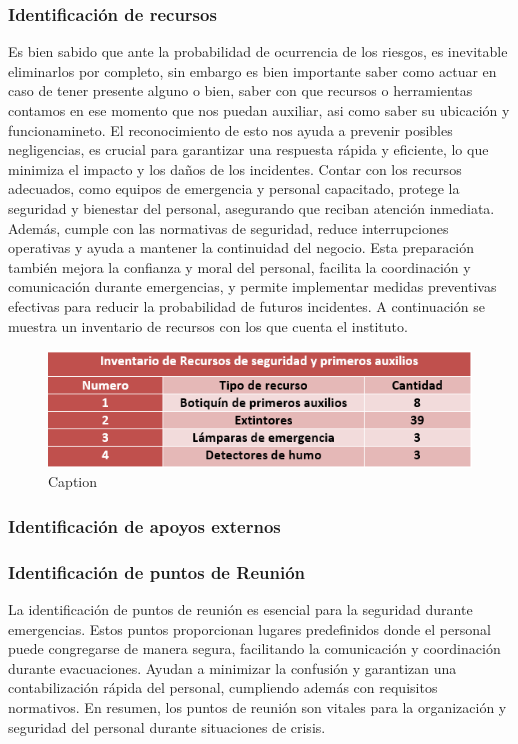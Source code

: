     \subsubsection{Identificación de recursos}
    Es bien sabido que ante la probabilidad de ocurrencia de los riesgos, es inevitable eliminarlos por completo, sin embargo es bien importante saber como actuar en caso de tener presente alguno o bien, saber con que recursos o herramientas contamos en ese momento que nos puedan auxiliar, asi como saber su ubicación y funcionamineto. El reconocimiento de esto nos ayuda a prevenir posibles negligencias, es crucial para garantizar una respuesta rápida y eficiente, lo que minimiza el impacto y los daños de los incidentes. Contar con los recursos adecuados, como equipos de emergencia y personal capacitado, protege la seguridad y bienestar del personal, asegurando que reciban atención inmediata. Además, cumple con las normativas de seguridad, reduce interrupciones operativas y ayuda a mantener la continuidad del negocio. Esta preparación también mejora la confianza y moral del personal, facilita la coordinación y comunicación durante emergencias, y permite implementar medidas preventivas efectivas para reducir la probabilidad de futuros incidentes.
    A continuación se muestra un inventario de recursos con los que cuenta el instituto.
    \begin{figure}[H]
        \centering
        \includegraphics[scale=0.4]{32/img/inventarioRecursos.png}
        \caption{Caption}
        \label{fig:enter-label}
    \end{figure}
    \subsubsection{Identificación de apoyos externos}
    \subsubsection{Identificación de puntos de Reunión}

    La identificación de puntos de reunión es esencial para la seguridad durante emergencias. Estos puntos proporcionan lugares predefinidos donde el personal puede congregarse de manera segura, facilitando la comunicación y coordinación durante evacuaciones. Ayudan a minimizar la confusión y garantizan una contabilización rápida del personal, cumpliendo además con requisitos normativos. En resumen, los puntos de reunión son vitales para la organización y seguridad del personal durante situaciones de crisis.
